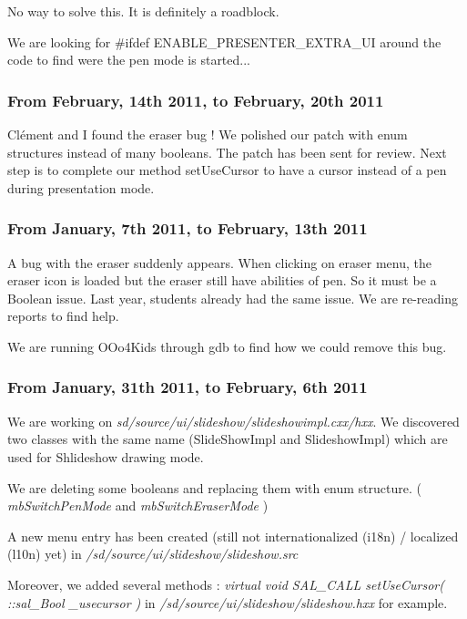 \documentclass[a4paper,11pt]{article}
\begin{document}
No way to solve this. It is definitely a roadblock.

We are looking for \#ifdef ENABLE\_PRESENTER\_EXTRA\_UI around the code to find were the pen mode is started...

\subsubsection*{From February, 14th 2011, to February, 20th 2011}

Clément and I found the eraser bug ! We polished our patch with enum structures instead of many booleans. The patch has been sent for review. Next step is to complete our method setUseCursor to have a cursor instead of a pen during presentation mode.


\subsubsection*{From January, 7th 2011, to February, 13th 2011}

A bug with the eraser suddenly appears. When clicking on eraser menu, the eraser icon is loaded but the eraser still have abilities of pen. So it must be a Boolean issue. Last year, students already had the same issue. We are re-reading reports to find help.

We are running OOo4Kids through gdb to find how we could remove this bug.

\subsubsection*{From January, 31th 2011, to February, 6th 2011}

We are working on \emph{sd/source/ui/slideshow/slideshowimpl.cxx/hxx}. We discovered two classes with the same name (SlideShowImpl and SlideshowImpl) which are used for Shlideshow drawing mode.

We are deleting some booleans and replacing them with enum structure. ( \emph{mbSwitchPenMode} and \emph{mbSwitchEraserMode} )

A new menu entry has been created (still not internationalized (i18n) / localized (l10n) yet) in \emph{/sd/source/ui/slideshow/slideshow.src}

Moreover, we added several methods : \emph{virtual void SAL\_CALL setUseCursor( ::sal\_Bool \_usecursor )} in \emph{/sd/source/ui/slideshow/slideshow.hxx} for example.
\end{document}
